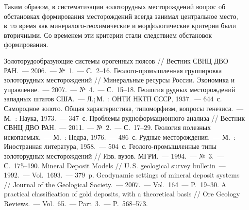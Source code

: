 Таким образом, в систематизации золоторудных месторождений вопрос об обстановках формирования месторождений всегда занимал центральное место, в~то время как минералого-геохимические и морфологические критерии были вторичными. Со временем эти критерии стали следствием обстановок формирования.

\begin{thebibliography}{99}
\bibitem{} Золоторудообразующие системы орогенных поясов // Вестник СВНЦ ДВО РАН.~--- 2006.~--- №~1.~--- С.~2--16.
\bibitem{} Геолого-промышленная группировка золоторудных месторождений // Минеральные ресурсы России. Экономика и управление.~--- 2007.~--- №~4.~--- С.~15--18.
\bibitem{} Геология рудных месторождений западных штатов США.~--- Л.;\,М.~: ОНТИ НКТП СССР, 1937.~--- 644~с.
\bibitem{} Самородное золото. Общая характеристика, типоморфизм, вопросы генезиса.~--- М.~: Наука, 1973.~--- 347~с.
\bibitem{} Проблемы рудноформационного анализа // Вестник СВНЦ ДВО РАН.~--- 2011.~--- №~2.~--- С.~17--29.
\bibitem{} Геология полезных ископаемых.~--- М.~: Недра, 1976.~--- 486~с.
\bibitem{} Рудные месторождения.~--- М.~: Иностранная литература, 1958.~--- 504~с.
\bibitem{} Геолого-промышленные типы золоторудных месторождений // Изв. вузов. МГРИ.~--- 1994.~--- №~3.~--- С.~175--190.
\bibitem{} Mineral Deposit Models // U.\,S. geological survey bulletin~--- 1992.~--- Vol.~1693.~--- 379~p.
\bibitem{} Geodynamic settings of mineral deposit systems // Journal of the Geological Society.~--- 2007.~--- Vol.~164~--- P.~19--30.
\bibitem{} A practical classification of gold deposits, with a theoretical basis // Ore Geology Reviews.~--- Vol.~65.~--- Part~3.~--- P.~568--573.
\end{thebibliography}
\thispagestyle{empty}
